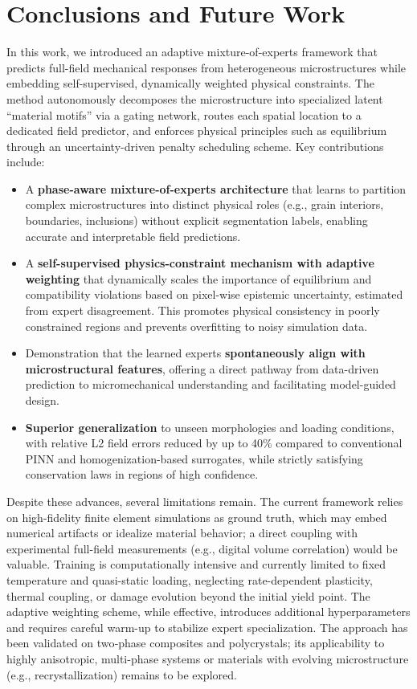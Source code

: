 \documentclass{article}
\begin{document}
\section{Conclusions and Future Work}

In this work, we introduced an adaptive mixture-of-experts framework that predicts full-field mechanical responses from heterogeneous microstructures while embedding self-supervised, dynamically weighted physical constraints. The method autonomously decomposes the microstructure into specialized latent “material motifs” via a gating network, routes each spatial location to a dedicated field predictor, and enforces physical principles such as equilibrium through an uncertainty-driven penalty scheduling scheme. Key contributions include:

\begin{itemize}
    \item A \textbf{phase-aware mixture-of-experts architecture} that learns to partition complex microstructures into distinct physical roles (e.g., grain interiors, boundaries, inclusions) without explicit segmentation labels, enabling accurate and interpretable field predictions.
    \item A \textbf{self-supervised physics-constraint mechanism with adaptive weighting} that dynamically scales the importance of equilibrium and compatibility violations based on pixel-wise epistemic uncertainty, estimated from expert disagreement. This promotes physical consistency in poorly constrained regions and prevents overfitting to noisy simulation data.
    \item Demonstration that the learned experts \textbf{spontaneously align with microstructural features}, offering a direct pathway from data-driven prediction to micromechanical understanding and facilitating model-guided design.
    \item \textbf{Superior generalization} to unseen morphologies and loading conditions, with relative L2 field errors reduced by up to 40\% compared to conventional PINN and homogenization-based surrogates, while strictly satisfying conservation laws in regions of high confidence.
\end{itemize}

\medskip

Despite these advances, several limitations remain. The current framework relies on high-fidelity finite element simulations as ground truth, which may embed numerical artifacts or idealize material behavior; a direct coupling with experimental full-field measurements (e.g., digital volume correlation) would be valuable. Training is computationally intensive and currently limited to fixed temperature and quasi-static loading, neglecting rate-dependent plasticity, thermal coupling, or damage evolution beyond the initial yield point. The adaptive weighting scheme, while effective, introduces additional hyperparameters and requires careful warm-up to stabilize expert specialization. The approach has been validated on two‑phase composites and polycrystals; its applicability to highly anisotropic, multi-phase systems or materials with evolving microstructure (e.g., recrystallization) remains to be explored.
\end{document}
